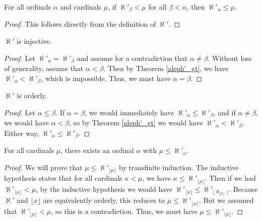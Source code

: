 \documentclass[../../math.tex]{subfiles}
\begin{document}
\begin{theorem} \label{aleph'_least}
    For all ordinals $\alpha$ and cardinals $\mu$, if $\aleph'_\beta < \mu$ for
    all $\beta < \alpha$, then $\aleph'_\alpha \leq \mu$.
\end{theorem}
\begin{proof}
    This follows directly from the definition of $\aleph'$.
\end{proof}

\begin{instance}
    $\aleph'$ is injective.
\end{instance}
\begin{proof}
    Let $\aleph'_\alpha = \aleph'_\beta$ and assume for a contradiction that
    $\alpha \neq \beta$.  Without loss of generality, assume that $\alpha <
    \beta$.  Then by Theorem \ref{aleph'_gt}, we have $\aleph'_\alpha <
    \aleph'_\beta$, which is impossible.  Thus, we must have $\alpha = \beta$.
\end{proof}

\begin{instance}
    $\aleph'$ is orderly.
\end{instance}
\begin{proof}
    Let $\alpha \leq \beta$.  If $\alpha = \beta$, we would immediately have
    $\aleph'_\alpha \leq \aleph'_\beta$, and if $\alpha \neq \beta$, we would
    have $\alpha < \beta$, so by Theorem \ref{aleph'_gt} we would have
    $\aleph'_\alpha < \aleph'_\beta$.  Either way, $\aleph'_\alpha \leq
    \aleph'_\beta$.
\end{proof}

\begin{lemma}
    For all cardinals $\mu$, there exists an ordinal $\alpha$ with $\mu \leq
    \aleph'_\alpha$.
\end{lemma}
\begin{proof}
    We will prove that $\mu \leq \aleph'_{\lfloor \mu \rfloor}$ by transfinite
    induction.  The inductive hypothesis states that for all cardinals $\kappa <
    \mu$, we have $\kappa \leq \aleph'_{\lfloor \mu \rfloor}$.  Then if we had
    $\aleph'_{\lfloor \mu \rfloor} < \mu$, by the inductive hypothesis we would
    have $\aleph'_{\lfloor \mu \rfloor} \leq \aleph'_{\lfloor \aleph_{\lfloor
    \mu \rfloor} \rfloor}$.  Because $\aleph'$ and $\lfloor x \rfloor$ are
    equivalently orderly, this reduces to $\mu \leq \aleph'_{\lfloor \mu
    \rfloor}$.  But we assumed that $\aleph'_{\lfloor \mu \rfloor} < \mu$, so
    this is a contradiction.  Thus, we must have $\mu \leq \aleph'_{\lfloor \mu
    \rfloor}$.
\end{proof}
\end{document}
